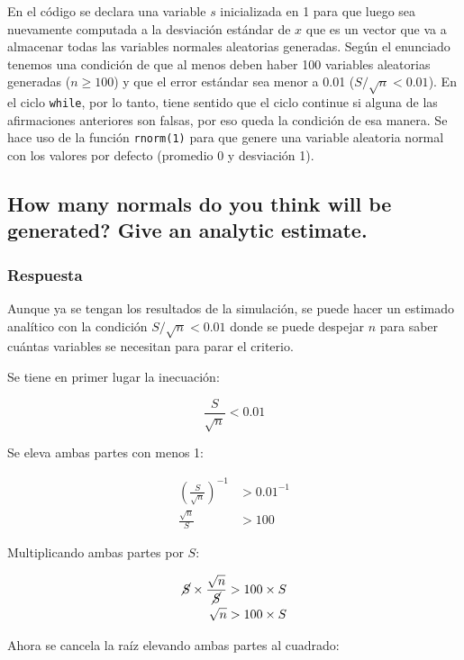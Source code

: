 \documentclass[12pt]{article}\usepackage[]{graphicx}\usepackage[]{xcolor}
\begin{document}
En el código se declara una variable $s$ inicializada en 1 para que luego sea nuevamente computada a la desviación estándar de $x$ que es un vector que va a almacenar todas las variables normales aleatorias generadas. Según el enunciado tenemos una condición de que al menos deben haber 100 variables aleatorias generadas ($n \geq 100$) y que el error estándar sea menor a 0.01 ($S / \sqrt{n} < 0.01$). En el ciclo \lstinline|while|, por lo tanto, tiene sentido que el ciclo continue si alguna de las afirmaciones anteriores son falsas, por eso queda la condición de esa manera. Se hace uso de la función \lstinline|rnorm(1)| para que genere una variable aleatoria normal con los valores por defecto (promedio 0 y desviación 1). 






\subsection{How many normals do you think will be generated? Give an analytic estimate.}
\label{subsec:p1-a}

\subsubsection{Respuesta}

Aunque ya se tengan los resultados de la simulación, se puede hacer un estimado analítico con la condición $S / \sqrt{n} < 0.01$ donde se puede despejar $n$ para saber cuántas variables se necesitan para parar el criterio.

Se tiene en primer lugar la inecuación:

\[
\frac{S}{\sqrt{n}} < 0.01
\]

Se eleva ambas partes con menos 1:

\begin{align*}
  \left(\frac{S}{\sqrt{n}}  \right)^{-1} &> 0.01^{-1} \\
  \frac{\sqrt{n}}{S}  &> 100
\end{align*}

Multiplicando ambas partes por $S$:

\begin{align*}
  \cancel{S} \times \frac{\sqrt{n}}{\cancel{S}}  &> 100 \times S \\
  \sqrt{n} &> 100 \times S 
\end{align*}

Ahora se cancela la raíz elevando ambas partes al cuadrado:
\end{document}
